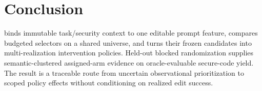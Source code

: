 \section{Conclusion}

\model binds immutable task/security context to one editable prompt feature,
compares budgeted selectors on a shared universe, and turns their frozen
candidates into multi-realization intervention policies. Held-out blocked
randomization supplies semantic-clustered assigned-arm evidence on
oracle-evaluable secure-code yield. The result is a traceable route from
uncertain observational prioritization to scoped policy effects without
conditioning on realized edit success.
